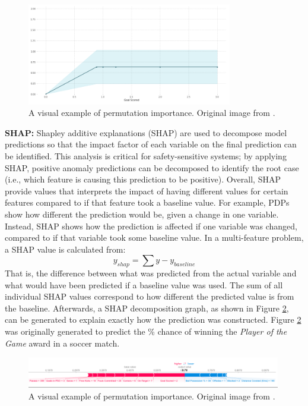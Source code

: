 \begin{figure}[H]
    \centering
    \includegraphics[width=0.8\textwidth]{images/ch3/pdp.jpeg}
    \caption{A visual example of permutation importance. Original image from \cite{pdp_plot}.}
    \label{fig:03pdp}
\end{figure}


\textbf{SHAP:} Shapley additive explanations (SHAP) are used to decompose model predictions so that the impact factor of each variable on the final prediction can be identified.  This analysis is critical for safety-sensitive systems; by applying SHAP, positive anomaly predictions can be decomposed to identify the root case (i.e., which feature is causing this prediction to be positive).  Overall, SHAP provide values that interprets the impact of having different values for certain features compared to if that feature took a baseline value.  For example, PDPs show how different the prediction would be, given a change in one variable. Instead, SHAP shows how the prediction is affected if one variable was changed, compared to if that variable took some baseline value.  In a multi-feature problem, a SHAP value is calculated from:
\begin{equation}
    y_{shap} = \sum y - y_{baseline}
    \label{eq:03SHAP}
\end{equation}
That is, the difference between what was predicted from the actual variable and what would have been predicted if a baseline value was used. The sum of all individual SHAP values correspond to how different the predicted value is from the baseline. Afterwards, a SHAP decomposition graph, as shown in Figure \ref{fig:03SHAPFig}, can be generated to explain exactly how the prediction was constructed.  Figure \ref{fig:03SHAPFig} was originally generated to predict the \% chance of winning the \textit{Player of the Game} award in a soccer match.

\begin{figure}[H]
    \centering
    \includegraphics[width=0.99\textwidth]{images/ch3/SHAP.jpeg}
    \caption{A visual example of permutation importance. Original image from \cite{SHAP_plot}.}
    \label{fig:03SHAPFig}
\end{figure}

